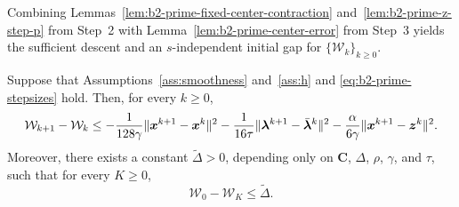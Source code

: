Combining Lemmas~\ref{lem:b2-prime-fixed-center-contraction}
and~\ref{lem:b2-prime-z-step-p} from Step~2 with
Lemma~\ref{lem:b2-prime-center-error} from Step~3 yields the sufficient descent
and an \(s\)-independent initial gap for \(\{\mathcal W_k\}_{k\ge0}\).

\begin{lemma}
\label{lem:b2-prime-potential-descent}
Suppose that Assumptions~\ref{ass:smoothness} and~\ref{ass:h} and
\eqref{eq:b2-prime-stepsizes} hold. Then, for every \(k\ge0\),
\[
    \mathcal W_{k+1}-\mathcal W_k
    \le -\frac{1}{128\gamma}\|\bm{x}^{k+1}-\bm{x}^k\|^2
        -\frac{1}{16\tau}\|\bm{\lambda}^{k+1}-\bar{\bm{\lambda}}^k\|^2
        -\frac{\alpha}{6\gamma}\|\bm{x}^{k+1}-\bm{z}^k\|^2.
\]
Moreover, there exists a constant \(\tilde{\Delta}>0\), depending only on
\(\mathbf C\), \(\Delta\), \(\rho\), \(\gamma\), and \(\tau\), such that for
every \(K\ge0\),
\begin{equation}
    \mathcal W_0-\mathcal W_K\le\tilde{\Delta}.
    \label{eq:b2-prime-initial-gap}
\end{equation}
\end{lemma}

